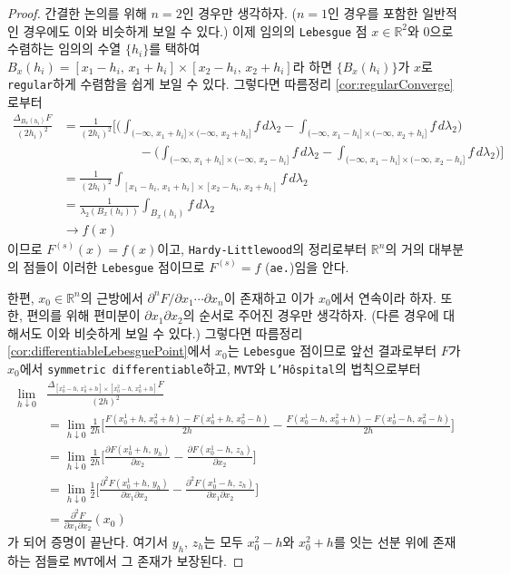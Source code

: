 \begin{proof}
    간결한 논의를 위해 $n=2$인 경우만 생각하자. ($n=1$인 경우를 포함한 일반적인 경우에도 이와 비슷하게 보일 수 있다.) 이제 임의의 \texttt{Lebesgue} 점 $x\in\mathbb{R}^2$와 $0$으로 수렴하는 임의의 수열 $\{h_i\}$를 택하여 $B_x(h_i)=[x_1-h_i,\,x_1+h_i]\times[x_2-h_i,\,x_2+h_i]$라 하면 $\{B_x(h_i)\}$가 $x$로 \texttt{regular}하게 수렴함을 쉽게 보일 수 있다. 그렇다면 따름정리 \ref{cor:regularConverge}로부터
    \begin{align*}
        \frac{\Delta_{B_x(h_i)}F}{(2h_i)^2}&=\frac{1}{(2h_i)^2}\bigg[\bigg(\int_{(-\infty,\,x_1+h_i]\times(-\infty,\,x_2+h_i]}f\,d\lambda_2-\int_{(-\infty,\,x_1-h_i]\times(-\infty,\,x_2+h_i]}f\,d\lambda_2\bigg)\\
        &\qquad\qquad\qquad-\bigg(\int_{(-\infty,\,x_1+h_i]\times(-\infty,\,x_2-h_i]}f\,d\lambda_2-\int_{(-\infty,\,x_1-h_i]\times(-\infty,\,x_2-h_i]}f\,d\lambda_2\bigg)\bigg]\\
        &=\frac{1}{(2h_i)^2}\int_{[x_1-h_i,\,x_1+h_i]\times[x_2-h_i,\,x_2+h_i]}f\,d\lambda_2\\
        &=\frac{1}{\lambda_2(B_x(h_i))}\int_{B_x(h_i)}f\,d\lambda_2\\
        &\to f(x)
    \end{align*}
    이므로 $F^{(s)}(x)=f(x)$이고, \texttt{Hardy-Littlewood}의 정리로부터 $\mathbb{R}^n$의 거의 대부분의 점들이 이러한 \texttt{Lebesgue} 점이므로 $F^{(s)}=f$ (\texttt{ae.})임을 안다.

    한편, $x_0\in\mathbb{R}^n$의 근방에서 $\partial^nF/\partial x_1\cdots\partial x_n$이 존재하고 이가 $x_0$에서 연속이라 하자. 또한, 편의를 위해 편미분이 $\partial x_1\partial x_2$의 순서로 주어진 경우만 생각하자. (다른 경우에 대해서도 이와 비슷하게 보일 수 있다.) 그렇다면 따름정리 \ref{cor:differentiableLebesguePoint}에서 $x_0$는 \texttt{Lebesgue} 점이므로 앞선 결과로부터 $F$가 $x_0$에서 \texttt{symmetric differentiable}하고, \texttt{MVT}와 \texttt{L'H\^ospital}의 법칙으로부터
    \begin{align*}
        \lim_{h\downarrow0}&\frac{\Delta_{[x_0^1-h,\,x_0^1+h]\times[x_0^2-h,\,x_0^2+h]}F}{(2h)^2}\\
        &=\lim_{h\downarrow0}\frac{1}{2h}\bigg[\frac{F(x_0^1+h,\,x_0^2+h)-F(x_0^1+h,\,x_0^2-h)}{2h}-\frac{F(x_0^1-h,\,x_0^2+h)-F(x_0^1-h,\,x_0^2-h)}{2h}\bigg]\\
        &=\lim_{h\downarrow0}\frac{1}{2h}\bigg[\frac{\partial F(x_0^1+h,\,y_h)}{\partial x_2}-\frac{\partial F(x_0^1-h,\,z_h)}{\partial x_2}\bigg]\\
        &=\lim_{h\downarrow0}\frac{1}{2}\bigg[\frac{\partial^2F(x_0^1+h,\,y_h)}{\partial x_1\partial x_2}-\frac{\partial^2F(x_0^1-h,\,z_h)}{\partial x_1\partial x_2}\bigg]\\
        &=\frac{\partial^2 F}{\partial x_1\partial x_2}(x_0)
    \end{align*}
    가 되어 증명이 끝난다. 여기서 $y_h,\,z_h$는 모두 $x_0^2-h$와 $x_0^2+h$를 잇는 선분 위에 존재하는 점들로 \texttt{MVT}에서 그 존재가 보장된다.
\end{proof}

